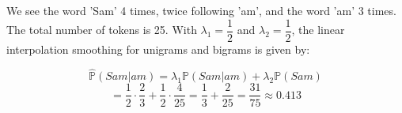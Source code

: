\documentclass[11pt,journal]{article}
\begin{document}
	We see the word 'Sam' 4 times, twice following 'am', and the word 'am' 3 times. The total number of tokens is 25. With $\lambda_1 = \dfrac{1}{2}$ and $\lambda_2 = \dfrac{1}{2}$, the linear interpolation smoothing for unigrams and bigrams is given by:
	
	\[\hat{\mathbb{P}}(Sam|am) = \lambda_1\mathbb{P}(Sam|am) + \lambda_2\mathbb{P}(Sam) \]
	\[ = \dfrac{1}{2} \cdot \dfrac{2}{3} + \dfrac{1}{2} \cdot \dfrac{4}{25} = \dfrac{1}{3} + \dfrac{2}{25} = \dfrac{31}{75} \approx 0.413 \]
	
	

	
\end{document}
